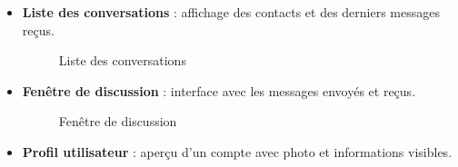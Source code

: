 \documentclass[12pt]{report}
\begin{document}
\begin{itemize}
		\item \textbf{Liste des conversations} : affichage des contacts et des derniers messages reçus.
		
		\begin{figure}[H]
			\centering
			\begin{minipage}[t]{0.5\textwidth}
				\centering
				\caption{Liste des conversations}
			\end{minipage}
		\end{figure}
		
		\item \textbf{Fenêtre de discussion} : interface avec les messages envoyés et reçus.
		
		\begin{figure}[H]
			\centering
			\begin{minipage}[t]{0.5\textwidth}
				\centering
				\caption{Fenêtre de discussion}
			\end{minipage}
		\end{figure}
		
		\item \textbf{Profil utilisateur} : aperçu d’un compte avec photo et informations visibles.
		

\end{itemize}
\end{document}
